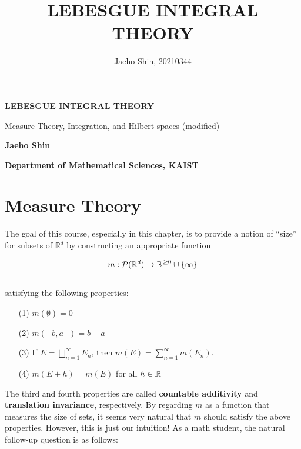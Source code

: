 \documentclass[12pt, a4paper, openany, twoside]{book}
\author{Jaeho Shin, 20210344}
\title{LEBESGUE INTEGRAL THEORY}
\theoremstyle{definition}
\theoremstyle{remark}
\theoremstyle{plain}
\numberwithin{equation}{section}
\begin{document}
\begin{titlepage}
    \begin{center}
        \vspace*{9cm}
            
        \Huge
        \textbf{LEBESGUE INTEGRAL THEORY}
    
        \vspace{1cm}
        \large
        Measure Theory, Integration, and Hilbert spaces (modified)
        \vspace{3cm}
        
        \LARGE
        \textbf{Jaeho Shin}
            
        \vspace{8cm}
            
        \normalsize
        \textbf{Department of Mathematical Sciences, KAIST}\\  
    \end{center}
\end{titlepage}

\hypersetup{linkcolor=black}
\tableofcontents
\hypersetup{linkcolor=blue}

\newpage

\chapter{Measure Theory}\mbox{}

The goal of this course, especially in this chapter, is to provide a notion of “size” for subsets of $\mathbb{R}^d$ by constructing an appropriate function

\[m:\mathcal{P}({\mathbb {R}}^d)\rightarrow{\mathbb {R}}^{\geq 0}\cup\{\infty\}\]
\\
satisfying the following properties:
\begin{enumerate}
    \item [(1)] $m(\emptyset)=0$
    \item [(2)] $m([b,a])=b-a$
    \item [(3)] If $E=\bigsqcup_{n=1}^{\infty}{E_n}$, then $m(E)=\sum_{n=1}^{\infty}{m(E_n)}$.
    \item [(4)] $m(E+h)=m(E)$ for all $h\in{\mathbb {R}}$
\end{enumerate}
The third and fourth properties are called \textbf{countable additivity} and \textbf{translation invariance}, respectively. 
By regarding $m$ as a function that measures the size of sets, it seems very natural that $m$ should satisfy the above properties. 
However, this is just our intuition! As a math student, the natural follow-up question is as follows:
\end{document}
